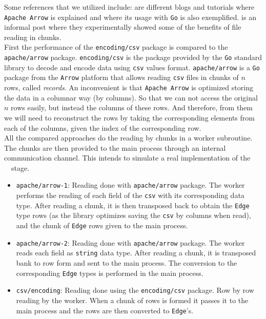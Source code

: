 Some references that we utilized include: \cite{exps-input-read-go_apache_arrow, exps-input-read-apache_arrow_go_match, exps-input-read-apache_arrow_medium, exps-input-read-golang_arrow_voltrondata} are different blogs and tutorials where \texttt{Apache Arrow} is explained and where its usage with \texttt{Go} is also exemplified.
\cite{exps-chunk-by-chunk-reading} is an informal post where they experimentally showed some of the benefits of file reading in chunks.\\

First the performance of the \texttt{encoding/csv} package is compared to the \texttt{apache/arrow} package. \texttt{encoding/csv} \cite{go-encoding-csv} is the package provided by the \texttt{Go} standard library to decode and encode data using \texttt{csv} values format.
\texttt{apache/arrow} \cite{apache-arrow-go} is a \texttt{Go} package from the \texttt{Arrow} platform \cite{apache-arrow-platform} that allows reading \texttt{csv} files in chunks of $n$ rows, called \emph{records}. An inconvenient is that \texttt{Apache Arrow} is optimized storing the data in a columnar way (by columns). So that we can not access the original $n$ rows easily, but instead the columns of these rows. And therefore, from them we will need to reconstruct the rows by taking the corresponding elements from each of the columns, given the index of the corresponding row.\\

All the compared approaches do the reading by chunks in a worker subroutine. The chunks are then provided to the main process through an internal communication channel. This intends to simulate a real implementation of the \source\ \Sr\ stage.

\begin{itemize}
  \item \texttt{apache/arrow-1}: Reading done with \texttt{apache/arrow} package. The worker performs the reading of each field of the \texttt{csv} with its corresponding data type. After reading a chunk, it is then transposed back to obtain the \texttt{Edge} type rows (as the library optimizes saving the \texttt{csv} by columns when read), and the chunk of \texttt{Edge} rows given to the main process. 
  \item \texttt{apache/arrow-2}: Reading done with \texttt{apache/arrow} package. The worker reads each field as \texttt{string} data type. After reading a chunk, it is transposed bank to row form and sent to the main process. The conversion to the corresponding \texttt{Edge} types is performed in the main process.
  \item \texttt{csv/encoding}: Reading done using the \texttt{encoding/csv} package. Row by row reading by the worker. When a chunk of rows is formed it passes it to the main process and the rows are then converted to \texttt{Edge}'s.
\end{itemize}

